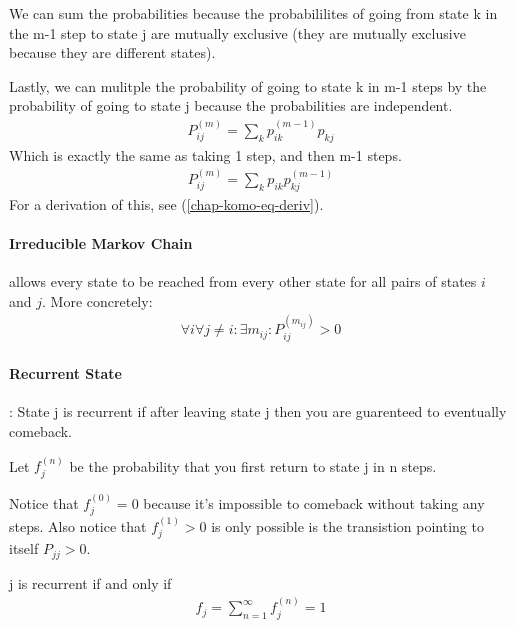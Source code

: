 We can sum the probabilities because the probabililites of going from state k in
the m-1 step to state j are mutually exclusive (they are mutually exclusive
because they are different states).

Lastly, we can mulitple the probability of going to state k in m-1 steps by the
probability of going to state j because the probabilities are independent.
\begin{equation*} \begin{split}
	P_{ij}^{(m)} = \sum_k p_{ik}^{(m-1)} p_{kj}
\end{split} \end{equation*}
Which is exactly the same as taking 1 step, and then m-1 steps.
\begin{equation*} \begin{split}
	P_{ij}^{(m)} = \sum_k p_{ik}p_{kj}^{(m-1)}
\end{split} \end{equation*}
For a derivation of this, see (\ref{chap-komo-eq-deriv}).


\paragraph{Irreducible Markov Chain} allows every state to be reached from every
other state for all pairs of states $i$ and $j$. More concretely:
\begin{equation*} \begin{split}
	\forall i \forall j \ne i : \exists m_{ij}  : P_{ij}^{(m_{ij})} > 0 
\end{split} \end{equation*}

\paragraph{Recurrent State}: State j is recurrent if after leaving state j then
you are guarenteed to eventually comeback.

Let $f_j^{(n)}$ be the probability that you first return to state j in n steps.

Notice that $f_j^{(0)} = 0$ because it's impossible to comeback without taking any
steps. Also notice that $f_j^{(1)} > 0$ is only possible is the transistion pointing
to itself $P_{jj} > 0$.

j is recurrent if and only if
\begin{equation*} \begin{split}
	f_j = \sum_{n=1}^\infty f_j^{(n)} = 1
\end{split} \end{equation*}

